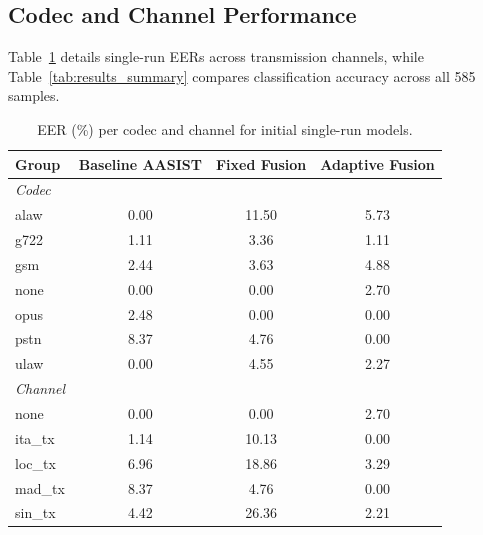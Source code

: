 \documentclass[conference]{IEEEtran}
\begin{document}
\subsection{Codec and Channel Performance}
Table~\ref{tab:codec} details single-run EERs across transmission channels, while Table~\ref{tab:results_summary} compares classification accuracy across all 585 samples.

\begin{table}[t]
\caption{EER (\%) per codec and channel for initial single-run models.}
\label{tab:codec}
\centering
\footnotesize
\setlength{\tabcolsep}{6pt}
\begin{tabular}{lccc}
\toprule
Group & Baseline AASIST & Fixed Fusion & Adaptive Fusion \\
\midrule
\multicolumn{4}{l}{\emph{Codec}}\\
alaw & 0.00 & 11.50 & 5.73\\
g722 & 1.11 & 3.36 & 1.11\\
gsm  & 2.44 & 3.63 & 4.88\\
none & 0.00 & 0.00 & 2.70\\
opus & 2.48 & 0.00 & 0.00\\
pstn & 8.37 & 4.76 & 0.00\\
ulaw & 0.00 & 4.55 & 2.27\\
\midrule
\multicolumn{4}{l}{\emph{Channel}}\\
none    & 0.00 & 0.00 & 2.70\\
ita\_tx & 1.14 & 10.13 & 0.00\\
loc\_tx & 6.96 & 18.86 & 3.29\\
mad\_tx & 8.37 & 4.76 & 0.00\\
sin\_tx & 4.42 & 26.36 & 2.21\\
\bottomrule
\end{tabular}
\end{table}
\end{document}
